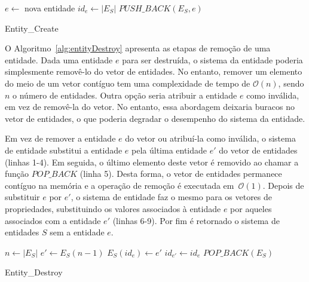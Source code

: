 \begin{algorithm}[ht]
 \LinesNumbered
      $e \gets $ nova entidade\;
      $id_e \gets |E_S|$\;
      $PUSH\_BACK(E_S, e)$\;
      \;
   \caption{Entity\_Create}
   \label{alg:entityCreate}
 \end{algorithm}

 O Algoritmo~\ref{alg:entityDestroy} apresenta as etapas de remoção de uma entidade. Dada uma entidade $ e $ para ser destruída, o sistema da entidade poderia simplesmente removê-lo do vetor de entidades. No entanto, remover um elemento do meio de um vetor contíguo tem uma complexidade de tempo de $\mathcal{O}(n)$, sendo $ n $ o número de entidades. Outra opção seria atribuir a entidade $ e $ como inválida, em vez de removê-la do vetor. No entanto, essa abordagem deixaria buracos no vetor de entidades, o que poderia degradar o desempenho do sistema da entidade.

  Em vez de remover a entidade $ e $ do vetor ou atribuí-la como inválida, o sistema de entidade substitui a entidade $e$ pela última entidade $e'$ do vetor de entidades (linhas 1-4). Em seguida, o último elemento deste vetor é removido ao chamar a função $ POP\_BACK $ (linha 5). Desta forma, o vetor de entidades permanece contíguo na memória e a operação de remoção é executada em~$\mathcal{O}(1)$. Depois de substituir $ e $ por $ e' $, o sistema de entidade faz o mesmo para os vetores de propriedades, substituindo os valores associados à entidade $ e $ por aqueles associados com a entidade $ e' $ (linhas 6-9). Por fim é retornado o sistema de entidades $S$ sem a entidade $e$.

 \begin{algorithm} [ht]
  \LinesNumbered
         $n \gets |E_S|$\;
         $e' \gets E_S(n-1)$\;
         $E_S(id_e) \gets e'$\;
         $id_{e'} \gets id_e$\;
         $POP\_BACK(E_S)$\;
         \;
    \caption{Entity\_Destroy}
    \label{alg:entityDestroy}
  \end{algorithm}



